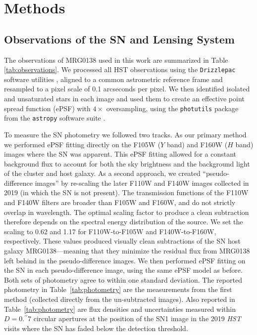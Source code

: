 \documentclass[12pt]{article}
\begin{document}



\section*{Methods}


\subsection*{Observations of the SN and Lensing System}

The observations of MRG0138 used in this work are  summarized in Table \ref{tab:observations}.   We processed all HST observations using the {\tt Drizzlepac} software utilities \cite{gonzaga_drizzlepac_2012}, aligned to a common astrometric reference frame and resampled to a pixel scale of 0.1 arcseconds per pixel.  We then identified isolated and unsaturated stars in each image and used them to create an effective point spread function (ePSF) with $4\times$ oversampling, using the {\tt photutils} package from the {\tt astropy} software suite \cite{the_astropy_collaboration_astropy_2018}.   

To measure the SN photometry we followed two tracks.  As our primary method we performed ePSF fitting directly on the F105W ($Y$ band) and F160W ($H$ band) images where the SN was apparent.  This ePSF fitting allowed for a constant background flux to account for both the sky brightness and the background light of the cluster and host galaxy.  
As a second approach, we created ``pseudo-difference images'' by re-scaling the later F110W and F140W images collected in 2019 (in which the SN is not present).  The transmission functions of the F110W and F140W filters are broader than F105W and F160W, and do not strictly overlap in wavelength.  The optimal scaling factor to produce a clean subtraction therefore depends on the spectral energy distribution of the source.  We set the scaling to 0.62 and 1.17 for F110W-to-F105W and F140W-to-F160W, respectively.  These values produced visually clean subtractions of the SN host galaxy MRG0138---meaning that they minimize the residual flux from MRG0138 left behind in the pseudo-difference images.  We then performed ePSF fitting on the SN in each pseudo-difference image, using the same ePSF model as before.   Both sets of photometry agree to within one standard deviation.  The reported photometry in Table~\ref{tab:photometry} are the measurements from the first method (collected directly from the un-subtracted images).  Also reported in Table~\ref{tab:photometry} are flux densities and uncertainties measured within $D=0.^{\prime\prime}7$ circular apertures at the position of the SN1 image in the 2019 \textit{HST} visits where the SN has faded below the detection threshold.
\end{document}
